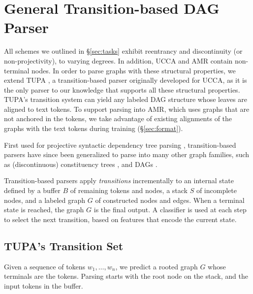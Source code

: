 \documentclass[11pt,a4paper]{article}
\begin{document}
\section{General Transition-based DAG Parser}\label{sec:model}

All schemes we outlined in \S\ref{sec:tasks} exhibit
reentrancy and discontinuity (or non-projectivity), to varying degrees.
In addition, UCCA and AMR contain non-terminal nodes.
In order to parse graphs with these structural properties,
we extend TUPA \cite[henceforth HAR17]{hershcovich2017a}, 
a transition-based parser 
originally developed for UCCA,
as it is the only parser to our knowledge that supports 
all these structural properties.
TUPA's transition system can yield any labeled DAG structure
whose leaves are aligned to text tokens.
To support parsing into AMR, which uses graphs that are not anchored in the tokens,
 we take advantage of existing alignments of the graphs with the text
tokens during training (\S\ref{sec:format}).

First used for projective syntactic dependency tree parsing \cite{Nivre03anefficient},
transition-based parsers have since been generalized to parse into many other
graph families, such as (discontinuous) constituency trees \cite[e.g., ][]{zhang2009transition,maier-lichte:2016:DiscoNLP},
and DAGs \cite[e.g.,][]{sagae2008shift,du-EtAl:2015:SemEval}. %

Transition-based parsers apply \textit{transitions}
incrementally to an internal state defined by a buffer $B$ of remaining tokens 
and nodes, a stack $S$ of incomplete nodes, and a labeled graph $G$ of 
constructed nodes and edges.
When a terminal state is reached, the graph $G$ is the final output.
A classifier is used at each step to select the next transition, 
based on features that encode the current state.




\subsection{TUPA's Transition Set}\label{sec:transition_set}

Given a sequence of tokens $w_1, \ldots, w_n$,
we predict a rooted graph $G$ whose terminals are the tokens.
Parsing starts with the root node on the stack,
and the input tokens in the buffer.
\end{document}
